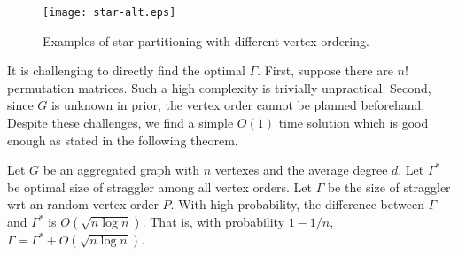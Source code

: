 \begin{figure}[h]
\centering
\texttt{[image: star-alt.eps]}
\caption{Examples of star partitioning with different vertex ordering.}
\label{fig:star-alt}
\end{figure}



It is challenging to directly find the optimal $\Gamma$. 
First, suppose there are $n!$ permutation matrices. 
Such a high complexity is trivially unpractical. Second,
since $G$ is unknown in prior,
the vertex order cannot be planned beforehand. 
Despite these challenges, we find a simple $O(1)$ time 
solution which is good enough as stated in the 
following theorem.

\begin{theorem}
\label{THM:SPM_LB}
Let $G$ be an aggregated graph with $n$ vertexes and the average degree $d$.
Let $\Gamma^*$ be optimal size of straggler among all vertex orders.
Let $\Gamma$ be the size of straggler wrt an random vertex order $P$. 
With high probability, the difference between $\Gamma$ and $\Gamma^*$ is $O(\sqrt{n \log n})$.
That is,  with probability $1-1/n$, 
$\Gamma = \Gamma^* + O(\sqrt{n \log n})$.
\end{theorem}

